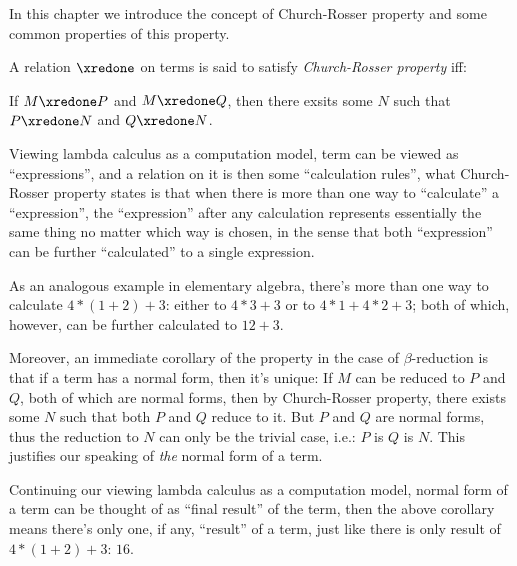 \documentclass[../../../include/open-logic-section]{subfiles}
\begin{document}


In this chapter we introduce the concept of Church-Rosser property and
some common properties of this property.

\begin{defn}
  A relation $\xredone$ on terms is said to satisfy \emph{Church-Rosser
    property} iff:
  
  If $M \xredone P$ and $M \xredone Q$, then there exsits some $N$
  such that $P \xredone N$ and $Q \xredone N$.
\end{defn}

Viewing lambda calculus as a computation model, term can be viewed as
``expressions'', and a relation on it is then some ``calculation
rules'', what Church-Rosser property states is that when there is more
than one way to ``calculate'' a ``expression'', the ``expression'' after
any calculation represents essentially the
same thing no matter which way is chosen, in the sense that both
``expression'' can be further ``calculated'' to a single expression.

As an analogous example in elementary algebra, there's more than one way to calculate $4*(1+2)+3$:
either to $4*3+3$ or to $4*1+4*2+3$; both of which, however, can be
further calculated to $12+3$.

Moreover, an immediate corollary of the property in the case of $\beta$-reduction is that if a term has
a normal form, then it's unique: If $M$ can be
reduced to $P$ and $Q$, both of which are normal forms, then by
Church-Rosser property, there exists some $N$ such that both $P$ and
$Q$ reduce to it. But $P$ and $Q$ are normal forms, thus the
reduction to $N$ can only be the trivial case, i.e.: $P$ is $Q$ is
$N$. This justifies our speaking of \emph{the} normal form of a term.

Continuing our viewing lambda calculus as a computation model, normal form of
a term can be thought of as ``final result'' of the term, then the above
corollary means there's only one, if any, ``result'' of a term, just
like there is only result of $4*(1+2)+3$: $16$.
\end{document}
